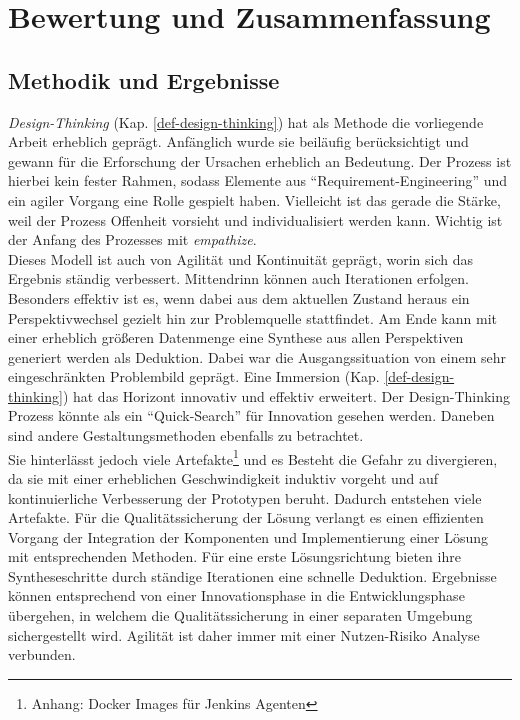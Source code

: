 \chapter{Bewertung und Zusammenfassung}
\label{chapter:evaluation}

\section{Methodik und Ergebnisse}
\emph{Design-Thinking} (Kap. \ref{def-design-thinking}) hat als Methode die vorliegende Arbeit erheblich geprägt. Anfänglich wurde sie beiläufig berücksichtigt und gewann für die Erforschung der Ursachen erheblich an Bedeutung. Der Prozess ist hierbei kein fester Rahmen, sodass Elemente aus \enquote{Requirement-Engineering} und ein agiler Vorgang eine Rolle gespielt haben. Vielleicht ist das gerade die Stärke, weil der Prozess Offenheit vorsieht und individualisiert werden kann. Wichtig ist der Anfang des Prozesses mit \emph{empathize}.
\medskip
\\
Dieses Modell ist auch von Agilität und Kontinuität geprägt, worin sich das Ergebnis ständig verbessert. Mittendrinn können auch Iterationen erfolgen.
Besonders effektiv ist es, wenn dabei aus dem aktuellen Zustand heraus ein Perspektivwechsel gezielt hin zur Problemquelle stattfindet. Am Ende kann mit einer erheblich größeren Datenmenge eine Synthese aus allen Perspektiven generiert werden als Deduktion. Dabei war die Ausgangssituation von einem sehr eingeschränkten Problembild geprägt. Eine Immersion (Kap. \ref{def-design-thinking}) hat das Horizont innovativ und effektiv erweitert. 
Der Design-Thinking Prozess könnte als ein \enquote{Quick-Search} für Innovation gesehen werden. Daneben sind andere Gestaltungsmethoden ebenfalls zu betrachtet.
\medskip
\\
Sie hinterlässt jedoch viele Artefakte\footnote{Anhang: Docker Images für Jenkins Agenten\label{appendix:docker}} und es Besteht die Gefahr zu divergieren, da sie mit einer erheblichen Geschwindigkeit induktiv vorgeht und auf kontinuierliche Verbesserung der Prototypen beruht. Dadurch entstehen viele Artefakte.
Für die Qualitätssicherung der Lösung verlangt es einen effizienten Vorgang der Integration der Komponenten und Implementierung einer Lösung mit entsprechenden Methoden. Für eine erste Lösungsrichtung bieten ihre Syntheseschritte durch ständige Iterationen eine schnelle Deduktion. Ergebnisse können entsprechend von einer Innovationsphase in die Entwicklungsphase übergehen, in welchem die Qualitätssicherung in einer separaten Umgebung sichergestellt wird. Agilität ist daher immer mit einer Nutzen-Risiko Analyse verbunden.

